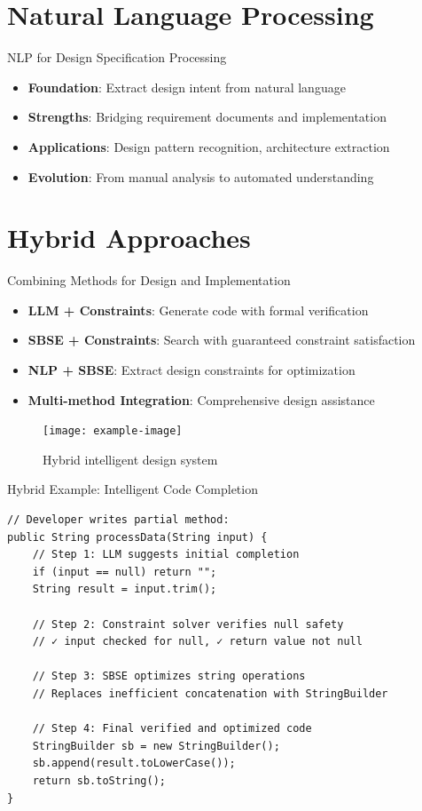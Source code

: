 \documentclass{beamer}
\begin{document}
\section{Natural Language Processing}
\begin{frame}[t]{NLP for Design Specification Processing}
\begin{itemize}
\item \textbf{Foundation}: Extract design intent from natural language
\item \textbf{Strengths}: Bridging requirement documents and implementation
\item \textbf{Applications}: Design pattern recognition, architecture extraction
\item \textbf{Evolution}: From manual analysis to automated understanding
\end{itemize}
\end{frame}

\section{Hybrid Approaches}
\begin{frame}[t]{Combining Methods for Design and Implementation}
\begin{itemize}
\item \textbf{LLM + Constraints}: Generate code with formal verification
\item \textbf{SBSE + Constraints}: Search with guaranteed constraint satisfaction
\item \textbf{NLP + SBSE}: Extract design constraints for optimization
\item \textbf{Multi-method Integration}: Comprehensive design assistance
\end{itemize}
\begin{figure}
\texttt{[image: example-image]}
\caption{Hybrid intelligent design system}
\end{figure}
\end{frame}

\begin{frame}[fragile,t]{Hybrid Example: Intelligent Code Completion}
\begin{verbatim}
// Developer writes partial method:
public String processData(String input) {
    // Step 1: LLM suggests initial completion
    if (input == null) return "";
    String result = input.trim();
    
    // Step 2: Constraint solver verifies null safety
    // ✓ input checked for null, ✓ return value not null
    
    // Step 3: SBSE optimizes string operations
    // Replaces inefficient concatenation with StringBuilder
    
    // Step 4: Final verified and optimized code
    StringBuilder sb = new StringBuilder();
    sb.append(result.toLowerCase());
    return sb.toString();
}
\end{verbatim}
\end{frame}
\end{document}
